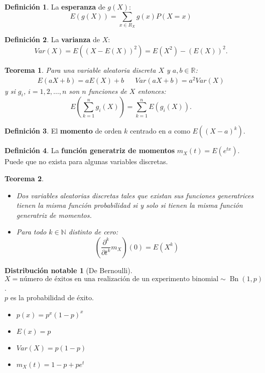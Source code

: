 \documentclass{article}
\newtheorem{theorem}{Teorema}
\theoremstyle{definition}
\newtheorem{define}{Definición}
\newtheorem{distr}{Distribución notable}
\theoremstyle{remark}
\DeclareMathOperator{\binomial}{Bn}
\newcommand{\reales}{\mathbb{R}}
\newcommand{\naturales}{\mathbb{N}}
\begin{document}
\begin{define}
	La \textbf{esperanza} de $g(X)$:
	\begin{equation*}
		E(g(X)) = \sum_{x \in R_X} g(x)P(X = x)
	\end{equation*}
\end{define}

\begin{define}
	La \textbf{varianza} de $X$:
	\begin{equation*}
		Var(X) = E((X - E(X))^2) = E(X^2) - (E(X))^2.
	\end{equation*}
\end{define}

\begin{theorem}
	Para una variable aleatoria discreta $X$ y $a, b \in \reales$:
	\begin{align*}
		E(aX + b) = aE(X) + b && Var(aX + b) = a^2Var(X)
	\end{align*}
	y si $g_i$, $i=1, 2, \ldots, n$ son $n$ funciones de $X$ entonces:
	\begin{equation*}
		E(\sum_{k=1}^{n} g_i(X)) = \sum_{k=1}^{n} E(g_i(X)).
	\end{equation*}
\end{theorem}

\begin{define}
	El \textbf{momento} de orden $k$ centrado en $a$ como $E((X-a)^k)$.
\end{define}

\begin{define}
	La \textbf{función generatriz de momentos} $m_X (t) = E(e^{tx})$. Puede que no exista para algunas variables discretas.
\end{define}

\begin{theorem}
\begin{itemize}
	\item
	Dos variables aleatorias discretas tales que existan sus funciones generatrices tienen la misma función probabilidad si y solo si tienen la misma función generatriz de momentos.
	
	\item
	Para todo $k \in \naturales$ distinto de cero:
	\begin{equation}
		(\frac{\partial^k}{\partial t^k} m_X)(0) = E(X^k)
	\end{equation}
	\end{itemize}
\end{theorem}

\begin{distr}[De Bernoulli]
	$X = \text{número de éxitos en una realización de un experimento binomial} \sim \binomial(1, p)$.\\
	$p$ es la probabilidad de éxito.
	\begin{itemize}
		\item
		$p(x) = p^x (1-p)^x$
		\item
		$E(x) = p$
		\item
		$Var(X) = p(1-p)$
		\item
		$m_X(t) = 1 - p + pe^t$
	\end{itemize}
\end{distr}
\end{document}
